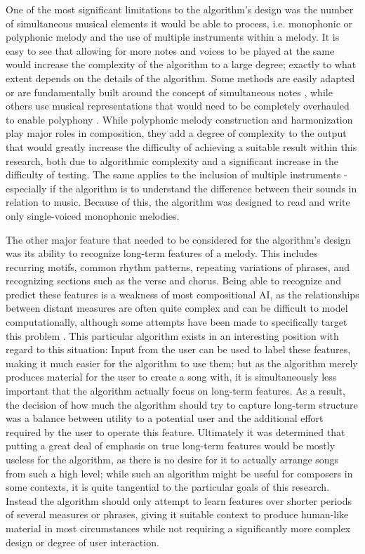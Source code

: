 \documentclass[ author={Stephen Livermore-Tozer},
				supervisor={Dr. Peter Flach},
				degree={MEng},
				title={Algorithmic Co-composition Using Machine Learning},
				subtitle={},
				type={research},
				year={2016} ]{dissertation}
\begin{document}
	One of the most significant limitations to the algorithm's design was the number of simultaneous musical elements it would be able to process, i.e. monophonic or polyphonic melody and the use of multiple instruments within a melody. It is easy to see that allowing for more notes and voices to be played at the same would increase the complexity of the algorithm to a large degree; exactly to what extent depends on the details of the algorithm. Some methods are easily adapted or are fundamentally built around the concept of simultaneous notes \cite{boenn2008automatic}, while others use musical representations that would need to be completely overhauled to enable polyphony \cite{todd1989connectionist}. While polyphonic melody construction and harmonization play major roles in composition, they add a degree of complexity to the output that would greatly increase the difficulty of achieving a suitable result within this research, both due to algorithmic complexity and a significant increase in the difficulty of testing. The same applies to the inclusion of multiple instruments - especially if the algorithm is to understand the difference between their sounds in relation to music. Because of this, the algorithm was designed to read and write only single-voiced monophonic melodies. 
	
	The other major feature that needed to be considered for the algorithm's design was its ability to recognize long-term features of a melody. This includes recurring motifs, common rhythm patterns, repeating variations of phrases, and recognizing sections such as the verse and chorus. Being able to recognize and predict these features is a weakness of most compositional AI, as the relationships between distant measures are often quite complex and can be difficult to model computationally, although some attempts have been made to specifically target this problem \cite{tokui2000music,paiement2007generative}. This particular algorithm exists in an interesting position with regard to this situation: Input from the user can be used to label these features, making it much easier for the algorithm to use them; but as the algorithm merely produces material for the user to create a song with, it is simultaneously less important that the algorithm actually focus on long-term features. As a result, the decision of how much the algorithm should try to capture long-term structure was a balance between utility to a potential user and the additional effort required by the user to operate this feature. Ultimately it was determined that putting a great deal of emphasis on true long-term features would be mostly useless for the algorithm, as there is no desire for it to actually arrange songs from such a high level; while such an algorithm might be useful for composers in some contexts, it is quite tangential to the particular goals of this research. Instead the algorithm should only attempt to learn features over shorter periods of several measures or phrases, giving it suitable context to produce human-like material in most circumstances while not requiring a significantly more complex design or degree of user interaction. 
	
\end{document}

